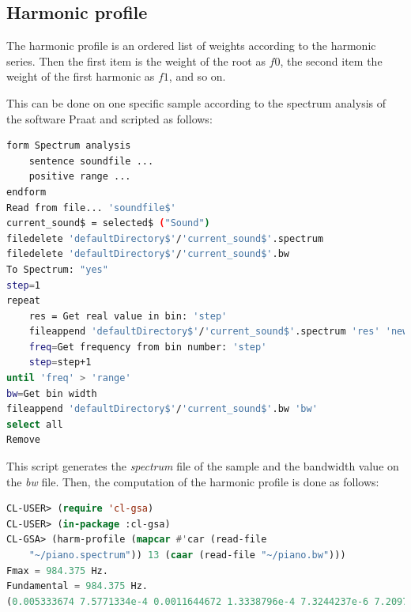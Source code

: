 \subsection{Harmonic profile}

The harmonic profile is an ordered list of weights according to the harmonic series. Then the first item is the weight of the root as $f0$, the second item the weight of the first harmonic as $f1$, and so on.

This can be done on one specific sample according to the spectrum analysis of the software Praat and scripted as follows:

\begin{lstlisting}[language=bash]
form Spectrum analysis
    sentence soundfile ...
    positive range ...
endform
Read from file... 'soundfile$'
current_sound$ = selected$ ("Sound")
filedelete 'defaultDirectory$'/'current_sound$'.spectrum
filedelete 'defaultDirectory$'/'current_sound$'.bw
To Spectrum: "yes"  
step=1
repeat 
    res = Get real value in bin: 'step'
    fileappend 'defaultDirectory$'/'current_sound$'.spectrum 'res' 'newline$'
    freq=Get frequency from bin number: 'step'
    step=step+1
until 'freq' > 'range' 	
bw=Get bin width
fileappend 'defaultDirectory$'/'current_sound$'.bw 'bw' 
select all
Remove
\end{lstlisting}

This script generates the \textsl{spectrum} file of the sample and the bandwidth value on the \textsl{bw} file.
Then, the computation of the harmonic profile is done as follows:

\begin{lstlisting}[language=Lisp]
CL-USER> (require 'cl-gsa)
CL-USER> (in-package :cl-gsa)
CL-GSA> (harm-profile (mapcar #'car (read-file 
    "~/piano.spectrum")) 13 (caar (read-file "~/piano.bw")))
Fmax = 984.375 Hz.
Fundamental = 984.375 Hz.
(0.005333674 7.5771334e-4 0.0011644672 1.3338796e-4 7.3244237e-6 7.2097446e-6 2.3828345e-6 4.374403e-6 4.064216e-6 1.18368014e-4 4.6414575e-6 5.292382e-6 2.4746847e-5)

\end{lstlisting}

